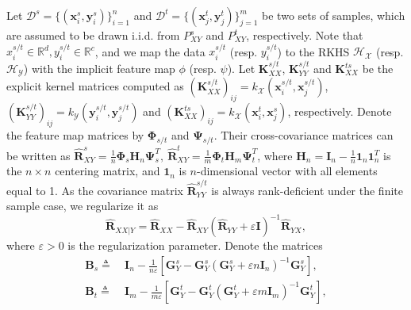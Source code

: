 \documentclass[final]{cvpr}
\newcommand{\MC}{\mathcal}
\newcommand{\MBB}{\mathbb}
\newcommand{\MBF}{\mathbf}
\begin{document}
Let $\MC{D}^{s} = \{ (\MBF{x}^s_i,\MBF{y}^s_i) \}_{i=1}^{n}$ and $\MC{D}^{t} = \{ (\MBF{x}^t_j,\MBF{y}^t_j) \}_{j=1}^{m}$ be two sets of samples, which are assumed to be drawn i.i.d. from $P^s_{XY}$ and $P^t_{XY}$, respectively. Note that $x^{s/t}_i \in \MBB{R}^{d}, y^{s/t}_i \in \MBB{R}^{c}$, and we map the data $x^{s/t}_i$ (resp. $y^{s/t}_i$) to the RKHS $\MC{H}_{\MC{X}}$ (resp. $\MC{H}_{\MC{Y}}$) with the implicit feature map $\phi$ (resp. $\psi$). Let $\MBF{K}^{s/t}_{XX}$, $\MBF{K}^{s/t}_{YY}$ and $\MBF{K}^{ts}_{XX}$ be the explicit kernel matrices computed as $(\MBF{K}^{s/t}_{XX})_{ij} = k_{\MC{X}}(\MBF{x}_i^{s/t},\MBF{x}_j^{s/t})$, $(\MBF{K}^{s/t}_{YY})_{ij} = k_{\MC{Y}}(\MBF{y}_i^{s/t},\MBF{y}_j^{s/t})$ and $(\MBF{K}^{ts}_{XX})_{ij} = k_{\MC{X}}(\MBF{x}_i^{t},\MBF{x}_j^{s})$, respectively. Denote the feature map matrices by $\MBF{\Phi}_{s/t}$ and $\MBF{\Psi}_{s/t}$.
Their cross-covariance matrices can be written as $\hat{\MBF{R}}^{s}_{XY} = \frac{1}{n} \MBF{\Phi}_{s} \MBF{H}_{n} \MBF{\Psi}_{s}^T , ~ \hat{\MBF{R}}^{t}_{XY} = \frac{1}{m} \MBF{\Phi}_{t} \MBF{H}_{m} \MBF{\Psi}_{t}^T$, where $\MBF{H}_{n} = \MBF{I}_n - \frac{1}{n} \MBF{1}_n \MBF{1}_n^T$ is the $n\times n$ centering matrix, and $\MBF{1}_n$ is $n$-dimensional vector with all elements equal to 1. As the covariance matrix $\hat{\MBF{R}}^{s/t}_{YY}$ is always rank-deficient under the finite sample case, we regularize it as %
\begin{equation}\label{eq:conditional-covariance_regular}
\hat{\MBF{R}}_{XX|Y} = \hat{\MBF{R}}_{XX} - \hat{\MBF{R}}_{XY} \left( \hat{\MBF{R}}_{YY} + \varepsilon \MBF{I} \right)^{-1} \hat{\MBF{R}}_{YX},
\end{equation}
where $\varepsilon > 0$ is the regularization parameter. Denote the matrices
\begin{equation*}\label{eq:matrix-B}
\begin{split}
\MBF{B}_{s} \triangleq & ~ \MBF{I}_{n} - \frac{1}{n\varepsilon} \left[ \MBF{G}^s_{Y} - \MBF{G}^s_{Y} \left( \MBF{G}^s_{Y} + \varepsilon n \MBF{I}_n \right)^{-1}\MBF{G}^s_{Y} \right], \\
\MBF{B}_{t} \triangleq & ~ \MBF{I}_{m} - \frac{1}{m\varepsilon} \left[ \MBF{G}^t_{Y} - \MBF{G}^t_{Y} \left( \MBF{G}^t_{Y} + \varepsilon m \MBF{I}_m \right)^{-1}\MBF{G}^t_{Y} \right],
\end{split}
\end{equation*}
\end{document}
